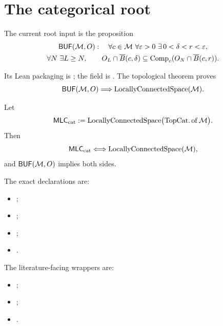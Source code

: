\section{The categorical root}

\begin{definition}
\label{def:categorical-root-input}
The current root input is the proposition
\[
\begin{gathered}
\mathsf{BUF}(\mathcal M,O):\quad
\forall c\in\mathcal M\ \forall\varepsilon>0\
\exists\,0<\delta<r<\varepsilon,\\
\forall N\ \exists L\ge N,\qquad
O_L\cap\overline B(c,\delta)
\subseteq
\operatorname{Comp}_c(O_N\cap\overline B(c,r)).
\end{gathered}
\]
\end{definition}

Its Lean packaging is
; the field is
.
The topological theorem
proves
\[
 \mathsf{BUF}(\mathcal M,O)\Longrightarrow
 \operatorname{LocallyConnectedSpace}(\mathcal M).
\]

\begin{theorem}
\label{thm:categorical-compatibility-root}
Let
\[
 \mathsf{MLC}_{\mathrm{cat}}
 :=
 \operatorname{LocallyConnectedSpace}
   \bigl(\operatorname{TopCat.of}\mathcal M\bigr).
\]
Then
\[
 \mathsf{MLC}_{\mathrm{cat}}
 \Longleftrightarrow
 \operatorname{LocallyConnectedSpace}(\mathcal M),
\]
and $\mathsf{BUF}(\mathcal M,O)$ implies both sides.
\end{theorem}

The exact declarations are:
\begin{itemize}
\item {};
\item {};
\item {};
\item {}.
\end{itemize}
The literature-facing wrappers are:
\begin{itemize}
\item {};
\item {};
\item {}.
\end{itemize}

